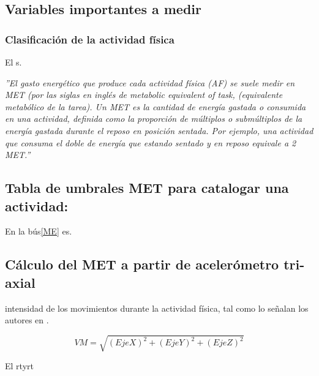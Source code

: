 \subsection{Variables importantes a medir}

\subsubsection{Clasificación de la actividad física}

El s. \hfill\break
 
\textit{
''El gasto energético que produce cada actividad física (AF) se suele medir en MET (por las siglas en inglés de metabolic equivalent of task, (equivalente metabólico de la tarea). Un MET es la cantidad de energía gastada o consumida en una actividad, definida como la proporción de múltiplos o submúltiplos de la energía gastada durante el reposo en posición sentada. Por ejemplo, una actividad que consuma el doble de energía que estando sentado y en reposo equivale a 2 MET.''} \hfill\break


\subsection{Tabla de umbrales MET para catalogar una actividad:}


    En la bús\ref{ME} es.\hfill\break

    

\subsection{Cálculo del MET a partir de acelerómetro tri-axial}
intensidad de los movimientos durante la actividad física, tal como lo señalan los autores en \cite{MET4}.\hfill\break


\begin{equation}
VM = \sqrt{(Eje X)^{2} + (Eje Y)^{2} + (Eje Z)^{2}}
\end{equation}

El rtyrt




